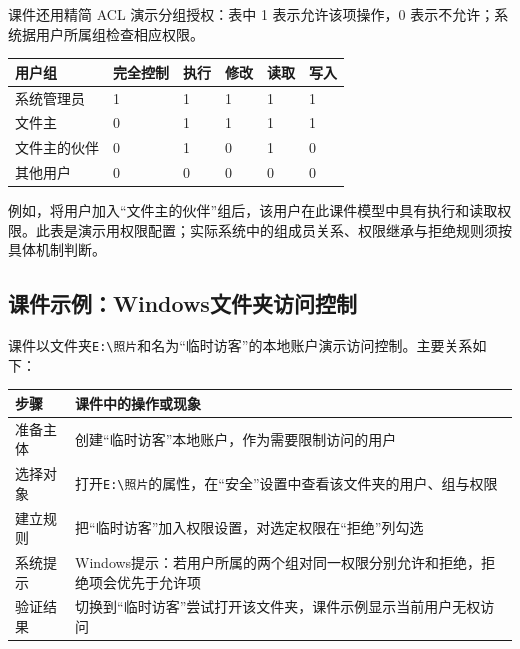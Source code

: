 课件还用精简 ACL 演示分组授权：表中 1 表示允许该项操作，0 表示不允许；系统据用户所属组检查相应权限。

\begin{wideblock}\par\medskip\noindent\begin{minipage}{\linewidth}\fontsize{9.3}{12}\selectfont\begin{tabularx}{\linewidth}{@{}YYYYYY@{}}
\toprule\noalign{}
用户组 & 完全控制 & 执行 & 修改 & 读取 & 写入 \\
\midrule\noalign{}


系统管理员 & 1 & 1 & 1 & 1 & 1 \\
文件主 & 0 & 1 & 1 & 1 & 1 \\
文件主的伙伴 & 0 & 1 & 0 & 1 & 0 \\
其他用户 & 0 & 0 & 0 & 0 & 0 \\
\bottomrule\end{tabularx}
\end{minipage}\par\medskip\end{wideblock}

例如，将用户加入``文件主的伙伴''组后，该用户在此课件模型中具有执行和读取权限。此表是演示用权限配置；实际系统中的组成员关系、权限继承与拒绝规则须按具体机制判断。

\subsection{课件示例：Windows文件夹访问控制}\label{OS04-windows-acl-demo}

课件以文件夹\texttt{E:\allowbreak{}\textbackslash{}照片}和名为``临时访客''的本地账户演示访问控制。主要关系如下：

\par\medskip\noindent\begin{minipage}{\linewidth}\fontsize{9.3}{12}\selectfont\begin{tabularx}{\linewidth}{@{}YY@{}}
\toprule\noalign{}
\begin{minipage}[b]{\linewidth}\raggedright
步骤
\end{minipage} & \begin{minipage}[b]{\linewidth}\raggedright
课件中的操作或现象
\end{minipage} \\
\midrule\noalign{}


准备主体 & 创建``临时访客''本地账户，作为需要限制访问的用户 \\
选择对象 & 打开\texttt{E:\allowbreak{}\textbackslash{}照片}的属性，在``安全''设置中查看该文件夹的用户、组与权限 \\
建立规则 & 把``临时访客''加入权限设置，对选定权限在``拒绝''列勾选 \\
系统提示 & Windows提示：若用户所属的两个组对同一权限分别允许和拒绝，拒绝项会优先于允许项 \\
验证结果 & 切换到``临时访客''尝试打开该文件夹，课件示例显示当前用户无权访问 \\
\bottomrule\end{tabularx}
\end{minipage}\par\medskip

